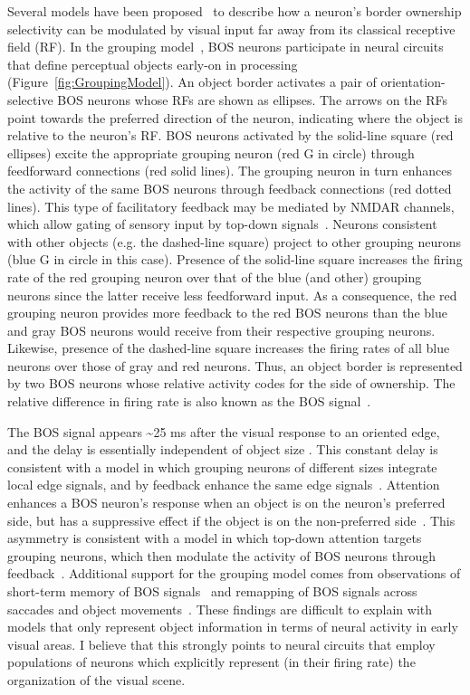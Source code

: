 Several models have been proposed~\citep{Zhaoping05, Sakai_Nishimura06,Craft_etal07, Layton_etal12} to describe how a neuron's border ownership selectivity can be modulated by visual input far away from its classical receptive field (RF). In the grouping model~\citep{Craft_etal07}, BOS neurons participate in neural circuits that define perceptual objects early-on in processing (Figure~\ref{fig:GroupingModel}). An object border activates a pair of orientation-selective BOS neurons whose RFs are shown as ellipses. The arrows on the RFs point towards the preferred direction of the neuron, indicating where the object is relative to the neuron's RF. BOS neurons activated by the solid-line square (red ellipses) excite the appropriate grouping neuron (red G in circle) through feedforward connections (red solid lines). The grouping neuron in turn enhances the activity of the same BOS neurons through feedback connections (red dotted lines). This type of facilitatory feedback may be mediated by NMDAR channels, which allow gating of sensory input by top-down signals~\citep{Palmer_etal14}. Neurons consistent with other objects (e.g. the dashed-line square) project to other grouping neurons (blue G in circle in this case). Presence of the solid-line square increases the firing rate of the red grouping neuron over that of the blue (and other) grouping neurons since the latter receive less feedforward input. As a consequence, the red grouping neuron provides more feedback to the red BOS neurons than the blue and gray BOS neurons would receive from their respective grouping neurons. Likewise, presence of the dashed-line square increases the firing rates of all blue neurons over those of gray and red neurons. Thus, an object border is represented by two BOS neurons whose relative activity codes for the side of ownership. The relative difference in firing rate is also known as the BOS signal~\citep{Zhou_etal00}.

The BOS signal appears \textasciitilde 25 ms after the visual response to an oriented edge, and the delay is essentially independent of object size \citep{Zhou_etal00}. This constant delay is consistent with a model in which grouping neurons of different sizes integrate local edge signals, and by feedback enhance the same edge  signals~\citep{Craft_etal07}. Attention enhances a BOS neuron's response when an object is on the neuron's preferred side, but has a suppressive effect if the object is on the non-preferred side~\citep{Qiu_etal07}. This asymmetry is consistent with a model in which top-down attention targets grouping neurons, which then modulate the activity of BOS neurons through feedback~\citep{Mihalas_etal11b}. Additional support for the grouping model comes from observations of short-term memory of BOS signals~\citep{OHerron_vonderHeydt09} and remapping of BOS signals across saccades and object movements~\citep{OHerron_vonderHeydt13}. These findings are difficult to explain with models that only represent object information in terms of neural activity in early visual areas. I believe that this strongly points to neural circuits that employ populations of neurons which explicitly represent (\ie in their firing rate) the organization of the visual scene.

